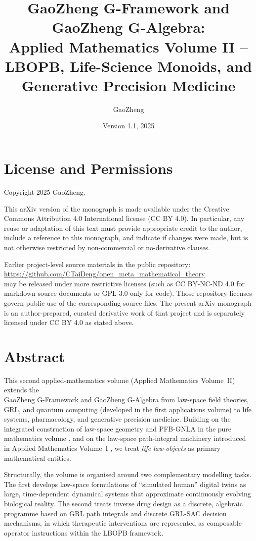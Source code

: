 \documentclass[11pt]{book}
\title{\textbf{GaoZheng G-Framework and GaoZheng G-Algebra:\\
Applied Mathematics Volume II -- LBOPB, Life-Science Monoids, and Generative Precision Medicine}}
\author{GaoZheng}
\date{Version 1.1, 2025}
\theoremstyle{plain}
\theoremstyle{definition}
\theoremstyle{remark}
\begin{document}
\raggedbottom 

\maketitle

\frontmatter

\chapter*{License and Permissions}


Copyright \textcopyright{} 2025 GaoZheng.

This arXiv version of the monograph is made available under the
Creative Commons Attribution 4.0 International license (CC BY 4.0).
In particular, any reuse or adaptation of this text must provide
appropriate credit to the author, include a reference to this
monograph, and indicate if changes were made, but is not otherwise
restricted by non-commercial or no-derivative clauses.

Earlier project-level source materials in the public repository: \\
\url{https://github.com/CTaiDeng/open_meta_mathematical_theory} \\
may be released under more restrictive licenses (such as
CC BY-NC-ND 4.0 for markdown source documents or GPL-3.0-only for
code). Those repository licenses govern public use of the
corresponding source files. The present arXiv monograph is an
author-prepared, curated derivative work of that project and is
separately licensed under CC BY 4.0 as stated above.


\chapter*{Abstract}


This second applied-mathematics volume (Applied Mathematics Volume~II)
extends the \\GaoZheng G-Framework and GaoZheng G-Algebra from
law-space field theories, GRL, and quantum computing (developed in the
first applications volume) to life systems, pharmacology, and
generative precision medicine. Building on the integrated construction
of law-space geometry and PFB-GNLA in the pure mathematics volume
\cite{GaoZheng2025GFramework},
and on the law-space path-integral machinery introduced in Applied
Mathematics Volume~I \cite{GaoZhengAppVol1}, we treat \emph{life
law-objects} as primary mathematical entities.

Structurally, the volume is organised around two complementary
modelling tasks. The first develops law-space formulations of
``simulated human'' digital twins as large, time-dependent dynamical
systems that approximate continuously evolving biological reality. The
second treats inverse drug design as a discrete, algebraic programme
based on GRL path integrals and discrete GRL-SAC decision mechanisms,
in which therapeutic interventions are represented as composable
operator instructions within the LBOPB framework.
\end{document}

